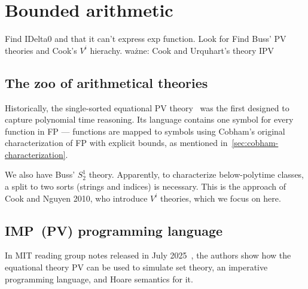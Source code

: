 
\chapter{Bounded arithmetic}\label{chap:bounded-arithmetic}

 Find IDelta0 and that it can't express exp function. Look for
 Find Buss' PV theories and Cook's $V^i$ hierachy.
 ważne: Cook and Urquhart's theory IPV

\section{The zoo of arithmetical theories}
Historically, the single-sorted equational PV theory~\cite{10.1145/800116.803756} was
the first designed to capture polynomial time reasoning.
Its language contains one symbol for every function in FP --- functions are mapped to symbols
using Cobham's original characterization of FP with explicit bounds, as mentioned in~\ref{sec:cobham-characterization}.

We also have Buss' $S^1_2$ theory. Apparently, to characterize below-polytime classes, a split to two sorts (strings and indices)
is necessary. This is the approach of Cook and Nguyen 2010, who introduce $V^i$ theories, which we focus on here.



\section{IMP~(PV) programming language}
In MIT reading group notes released in July 2025~\cite{Li2025FeasibleMathematics}, the authors show how the equational theory PV
can be used to simulate set theory, an imperative programming language, and Hoare semantics for it.

